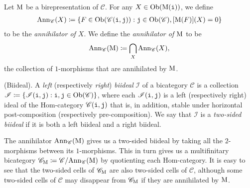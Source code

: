 \noindent Let $\textup{M}$ be a birepresentation of $\mathscr{C}$. For any $X \in \textup{Ob}(\textup{M}(\textup{\texttt{i}}))$, we define
\begin{align*}
\begin{split}
\textup{Ann}_\mathscr{C}(X) \coloneqq \{F \in \textup{Ob}(\mathscr{C}(\textup{\texttt{i}}, \textup{\texttt{j}})) : \textup{\texttt{j}} \in \textup{Ob}(\mathscr{C}), [\textup{M}(F)](X) = 0\}
\end{split}
\end{align*}
\noindent to be the {\em annihilator of $X$}. %
We define the {\em annihilator of $\textup{M}$} to be
\begin{align*}
\begin{split}
\textup{Ann}_\mathscr{C}(\textup{M}) \coloneqq \bigcap_{X} \textup{Ann}_\mathscr{C}(X),
\end{split}
\end{align*}
\noindent the collection of $1$-morphisms that are annihilated by $\textup{M}$.\\ %

\noindent\begin{definition}\textup{(Biideal).} A {\em left} (respectively {\em right}) {\em biideal} $\mathscr{I}$ of a bicategory $\mathscr{C}$ is a collection\linebreak $\mathscr{I} \coloneqq \{\mathscr{I}(\textup{\texttt{i}}, \textup{\texttt{j}}) : \textup{\texttt{i}}, \textup{\texttt{j}} \in \textup{Ob}(\mathscr{C})\}$, where each $\mathscr{I}(\textup{\texttt{i}}, \textup{\texttt{j}})$ is a left (respectively right) ideal of the Hom-category $\mathscr{C}(\textup{\texttt{i}}, \textup{\texttt{j}})$ that is, in addition, stable under horizontal post-composition (respectively pre-composition). We say that $\mathscr{I}$ is a {\em two-sided biideal} if it is both a left biideal and a right biideal.\\
\end{definition}

\noindent The annihilator $\textup{Ann}_\mathscr{C}(\textup{M})$ gives us a two-sided biideal by taking all the $2$-morphisms between its $1$-morphisms. This in turn gives us a multifinitary bicategory $\mathscr{C}_\textup{M} \coloneqq \mathscr{C}/\textup{Ann}_\mathscr{C}(\textup{M})$ by quotienting each Hom-category. It is easy to see that the two-sided cells of $\mathscr{C}_\textup{M}$ are also two-sided cells of $\mathscr{C}$, although some two-sided cells of $\mathscr{C}$ may disappear from $\mathscr{C}_\textup{M}$ if they are annihilated by $\textup{M}$.\\

